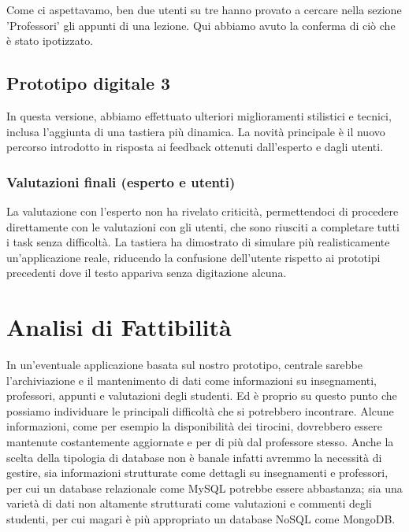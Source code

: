 Come ci aspettavamo, ben due utenti su tre hanno provato a cercare nella sezione 'Professori' gli appunti di una lezione. Qui abbiamo avuto la conferma di ciò che è stato ipotizzato.

\subsection{Prototipo digitale 3}
In questa versione, abbiamo effettuato ulteriori miglioramenti stilistici e tecnici, inclusa l’aggiunta di una tastiera più dinamica.
La novità principale è il nuovo percorso introdotto in risposta ai feedback ottenuti dall’esperto e dagli utenti.

\subsubsection{Valutazioni finali (esperto e utenti)}
La valutazione con l’esperto non ha rivelato criticità, permettendoci di procedere direttamente con le valutazioni con gli utenti, che sono riusciti a completare tutti i task senza difficoltà.
La tastiera ha dimostrato di simulare più realisticamente un’applicazione reale, riducendo la confusione dell’utente rispetto ai prototipi precedenti dove il testo appariva senza digitazione alcuna.

\section{Analisi di Fattibilità}
In un'eventuale applicazione basata sul nostro prototipo, centrale sarebbe l'archiviazione e il mantenimento di dati
come informazioni su insegnamenti, professori, appunti e valutazioni degli studenti.
Ed è proprio su questo punto che possiamo individuare le principali difficoltà che si potrebbero incontrare.
Alcune informazioni, come per esempio la disponibilità dei tirocini, dovrebbero essere mantenute costantemente aggiornate e per di più dal professore stesso. 
Anche la scelta della tipologia di database non è banale infatti avremmo la necessità di gestire, sia informazioni strutturate come dettagli su insegnamenti e professori, per cui un database relazionale come MySQL potrebbe essere abbastanza; sia una varietà di dati non altamente strutturati come valutazioni e commenti degli studenti, per cui magari è più appropriato un database NoSQL come MongoDB.
